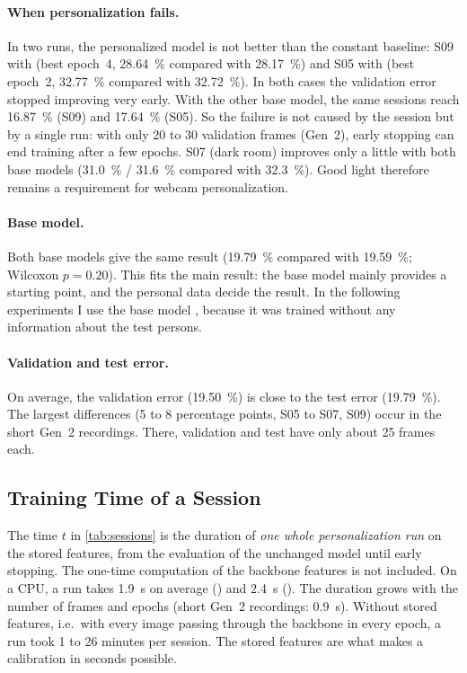 \paragraph{When personalization fails.}
In two runs, the personalized model is not better than the constant baseline:
S09 with  (best epoch~4, \SI{28.64}{\percent} compared with
\SI{28.17}{\percent}) and S05 with  (best epoch~2,
\SI{32.77}{\percent} compared with \SI{32.72}{\percent}). In both cases the
validation error stopped improving very early. With the other base model, the
same sessions reach \SI{16.87}{\percent} (S09) and \SI{17.64}{\percent} (S05).
So the failure is not caused by the session but by a single run: with only 20 to
30 validation frames (Gen~2), early stopping can end training after a few
epochs. S07 (dark room) improves only a little with both base models
(\SI{31.0}{\percent} / \SI{31.6}{\percent} compared with \SI{32.3}{\percent}).
Good light therefore remains a requirement for webcam personalization.

\paragraph{Base model.}
Both base models give the same result (\SI{19.79}{\percent} compared with
\SI{19.59}{\percent}; Wilcoxon $p=0.20$). This fits the main result: the base
model mainly provides a starting point, and the personal data decide the
result. In the following experiments I use the base model ,
because it was trained without any information about the test persons.

\paragraph{Validation and test error.} On average, the validation error
(\SI{19.50}{\percent}) is close to the test error (\SI{19.79}{\percent}). The
largest differences (5 to 8 percentage points, S05 to S07, S09) occur in the
short Gen~2 recordings. There, validation and test have only about 25 frames
each.

\subsection{Training Time of a Session}
\label{sec:session_time}

The time $t$ in \cref{tab:sessions} is the duration of \emph{one whole
personalization run} on the stored features, from the evaluation of the
unchanged model until early stopping. The one-time computation of the backbone
features is not included. On a CPU, a run takes \SI{1.9}{\second}
on average () and \SI{2.4}{\second} ().
The duration grows with the number of frames and epochs (short Gen~2
recordings: \SI{0.9}{\second}). Without
stored features, i.e.\ with every image passing through the backbone in every
epoch, a run took 1 to 26 minutes per session. The stored features are what
makes a calibration in seconds possible.

